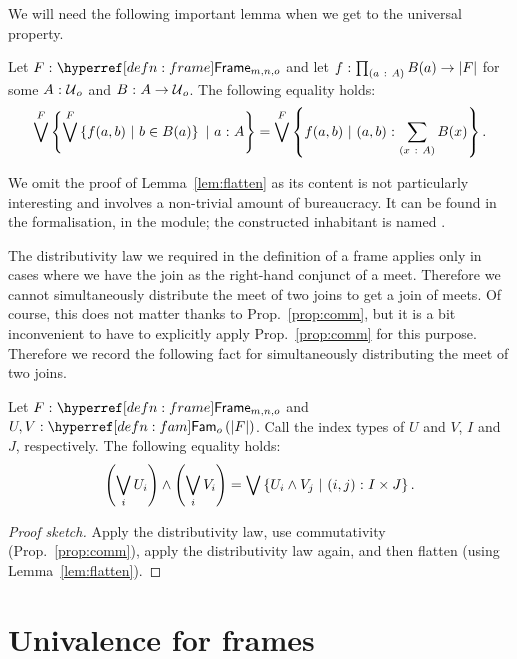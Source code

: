 We will need the following important lemma when we get to the universal property.
\begin{lemma}\label{lem:flatten}
  Let $\oftyI{F}{\framety{m}{n}{o}}$ and let $f\hspace{0.1mm}:\hspace{0.1mm}\prod_{(a~:~A)} B(a) \rightarrow \left| F \right|$ for
  some $A\hspace{0.1mm}:\hspace{0.1mm}\mathcal{U}{}_o$ and $B\hspace{0.1mm}:\hspace{0.1mm}A \rightarrow \mathcal{U}{}_o$. The following equality
  holds:
  \begin{equation*}
      \bigvee^F \left\{  \bigvee^F \left\{  f(a, b) ~|~ b \in B(a)  \right\} ~|~ a\hspace{0.1mm}:\hspace{0.1mm}A           \right\}
    = \bigvee^F \left\{  f(a, b)             ~|~ (a, b)\hspace{0.1mm}:\hspace{0.1mm}\sum_{(x~:~A)} B(x)  \right\}.
  \end{equation*}
\end{lemma}

We omit the proof of Lemma~\ref{lem:flatten} as its content is not particularly
interesting and involves a non-trivial amount of bureaucracy. It can be found in the
\veragda{} formalisation, in the  module; the constructed inhabitant is
named .

The distributivity law we required in the definition of a frame applies only in cases
where we have the join as the right-hand conjunct of a meet. Therefore we cannot
simultaneously distribute the meet of two joins to get a join of meets. Of course, this
does not matter thanks to Prop.~\ref{prop:comm}, but it is a bit inconvenient to have to
explicitly apply Prop.~\ref{prop:comm} for this purpose. Therefore we record the following
fact for simultaneously distributing the meet of two joins.

\begin{prop}\label{prop:distr}
  Let $\oftyI{F}{\framety{m}{n}{o}}$ and $\oftyII{U}{V}{\sub{o}{\abs{F}}}$. Call the index
  types of $U$ and $V$, $I$ and $J$, respectively. The following equality holds:
  \begin{equation*}
      \left( \bigvee_i U_i \right) \wedge \left( \bigvee_i V_i \right)
    = \bigvee \left\{  U_i \wedge V_j ~|~ (i, j)\hspace{0.1mm}:\hspace{0.1mm}I \times J  \right\}.
  \end{equation*}
\end{prop}
\begin{proof}[Proof sketch]
  Apply the distributivity law, use commutativity (Prop.~\ref{prop:comm}), apply the
  distributivity law again, and then flatten (using Lemma~\ref{lem:flatten}).
\end{proof}

\section{Univalence for frames}\label{sec:frame-univ}

